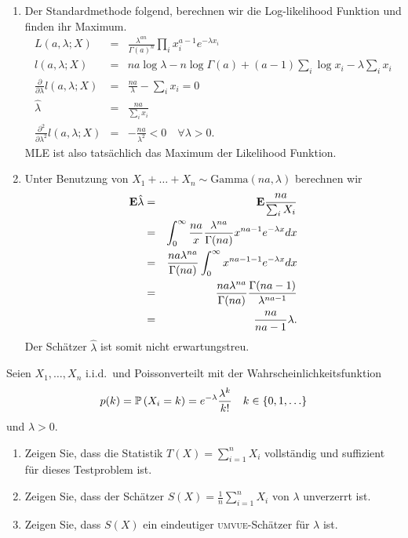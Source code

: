 \solution
\begin{enumerate}
    \item Der Standardmethode folgend, berechnen wir die Log-likelihood
        Funktion und finden ihr Maximum.
        \begin{eqnarray}
            L(a,\lambda; X) &=& \frac{\lambda^{an}}{\Gamma(a)^n} \prod_i x_i^{ a-1 } e^{-\lambda x_i} \\
            l(a,\lambda; X) &=& na \log \lambda - n \log \Gamma\left( a \right) + 
                                \left( a-1 \right) \sum_{i}^{} \log x_i - \lambda \sum_{i}^{} x_i \\
            \frac{\partial}{\partial \lambda} l(a,\lambda; X) &=&  \frac{na}{\lambda} - \sum_{i}^{} x_i = 0  \\
            \hat \lambda &=& \frac{na}{\sum_{i}^{} x_i} \\
            \frac{\partial^2}{\partial \lambda^2} l(a,\lambda; X) &=& - \frac{na}{ \lambda^2} <0 \quad \forall \lambda>0.
        \end{eqnarray}
        MLE ist also tatsächlich das Maximum der Likelihood Funktion. 
    \item Unter Benutzung von $X_1+ \ldots + X_n \sim \textrm{Gamma}(na,\lambda)$ berechnen wir
        \begin{eqnarray}
            \mathbf{E} \hat \lambda &=& \mathbf{E} \frac{na}{ \sum_{i}^{} X_i }  \\
            &=& \int_{0}^{\infty} \frac{na}{x} \frac{\lambda^{na}}{\Gamma(na)} x^{na-1} e^{-\lambda x} dx \\
            &=& \frac{na \lambda^{na}}{\Gamma(na)} \int_{0}^{\infty} x^{na -1-1} e^{-\lambda x}dx \\
            &=& \frac{na \lambda^{na}}{\Gamma(na)} \frac{\Gamma(na-1)}{\lambda^{na-1}} \\
            &=& \frac{na}{na-1} \lambda.
        \end{eqnarray}
        Der Schätzer $\hat\lambda$ ist somit nicht erwartungstreu.
\end{enumerate}










 Seien $X_1, \ldots, X_n$ i.i.d.\ 
und Poissonverteilt mit der Wahrscheinlichkeitsfunktion
\begin{equation*}
    p(k) = \mathbb P \left( X_i = k \right) = e^{-\lambda} \frac{\lambda^k}{ k!} \quad k \in \left\{ 0,1, \ldots \right\}
\end{equation*}
und $\lambda>0$.
\begin{enumerate}
    \item Zeigen Sie, dass die Statistik $T\left( X \right) = \sum_{i=1}^{n}
        X_i$ vollständig und suffizient für dieses Testproblem ist.
    \item Zeigen Sie, dass der Schätzer $S\left( X \right) = \frac{1}{n}
        \sum_{i=1}^{n} X_i$ von $\lambda$ unverzerrt ist.
    \item Zeigen Sie, dass $S(X)$ ein eindeutiger \textsc{umvue}-Schätzer für
        $\lambda$ ist.
\end{enumerate} 

